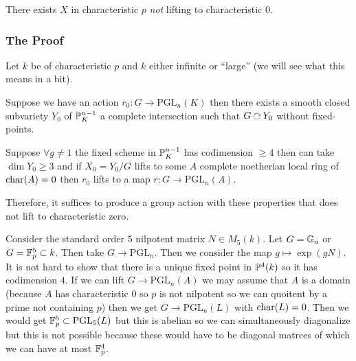 \documentclass[12pt]{article}
\begin{document}
\begin{thm}[Serre]
There exists $X$ in characteristic $p$ \textit{not} lifting to characteristic $0$.
\end{thm}

\subsubsection{The Proof}

\renewcommand{\PGL}{\mathrm{PGL}}

Let $k$ be of characteristic $p$ and $k$ either infinite or ``large'' (we will see what this means in a bit). 

\begin{prop}[Godeaux]
Suppose we have an action $r_0 : G \to \PGL_n(K)$ then there exists a smooth closed subvariety $Y_0$ of $\P^{n-1}_K$ a complete intersection such that $G \acts Y_0$ without fixed-points. 
\end{prop}

\begin{prop}[Serre]
Suppose $\forall g \neq 1$ the fixed scheme in $\P^{n-1}_K$ has codimension $\ge 4$ then can take $\dim{Y_0} \ge 3$ and if $X_0 = Y_0 /G$ lifts to some $A$ complete noetherian local ring of $\ch(A) = 0$ then $r_0$ lifts to a map $r : G \to \PGL_n(A)$.
\end{prop}

\begin{rmk}
Therefore, it suffices to produce a group action with these properties that does not lift to characteristic zero.
\end{rmk}

Consider the standard order $5$ nilpotent matrix $N \in M_5(k)$. Let $G = \Ga$ or $G = \FF_p^5 \subset k$. Then take $G \to \PGL_n$. Then we consider the map $g \mapsto \exp{(gN)}$. It is not hard to show that there is a unique fixed point in $\P^4(k)$ so it has codimension $4$. If we can lift $G \to \PGL_n(A)$ we may assume that $A$ is a domain (because $A$ has characteristic $0$ so $p$ is not nilpotent so we can quoitent by a prime not containing $p$) then we get $G \to \PGL_n(L)$ with $\ch(L) = 0$. Then we would get $\FF_p^5 \subset \PGL_5(L)$ but this is abelian so we can simultaneously diagonalize but this is not possible because these would have to be diagonal matrces of which we can have at most $\FF_p^4$. 
\end{document}
